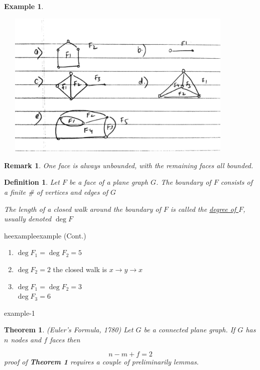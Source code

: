 \documentclass[12pt]{article}
\makeatletter
\newtheorem{theorem}{Theorem}
\newtheorem{example}{Example}
\newtheorem{definition}{Definition}
\newtheorem*{remark}{Remark}
\newenvironment{usecounterof}[2]{%
  \def\@tempb{#1}%
  \expandafter\renewcommand\csname the#1\endcsname{\ref{#2}}\@nameuse\@tempb}{%
    \@nameuse{end\@tempb}\addtocounter\@tempb{-1}}
\makeatother
\begin{document}
\begin{example}\label{a-thm}


  \begin{center}
  \includegraphics[width=12cm, height=7cm]{example2}
  \end{center}


\end{example}

\begin{remark}
  One face is always unbounded, with the remaining faces all bounded.
\end{remark}


\begin{definition}
  Let $F$ be a face of a plane graph $G$. The boundary of $F$ consists of a finite \# of vertices and edges of $G$

  The length of a closed walk around the boundary of $F$ is called the \underline{degree of $F$}, usually denoted $\deg F$

\end{definition}

\begin{usecounterof}{example}{a-thm} (Cont.)
\begin{enumerate}
  \item $\deg F_{1} = \deg F_{2} = 5$
  \item $\deg F_{2} = 2$ the closed walk is $x\to y \to x$
  \item $\deg F_{1} = \deg F_{2} = 3$\\
        $\deg F_{3} = 6$

\end{enumerate}


\end{usecounterof}


\begin{theorem}
  \textit{(Euler's Formula, 1780)} Let $G$ be a connected plane graph. If $G$ has $n$ nodes and $f$ faces then

  \[n - m + f = 2\]
  proof of \textbf{Theorem 1} requires a couple of preliminarily lemmas.
\end{theorem}
\end{document}
